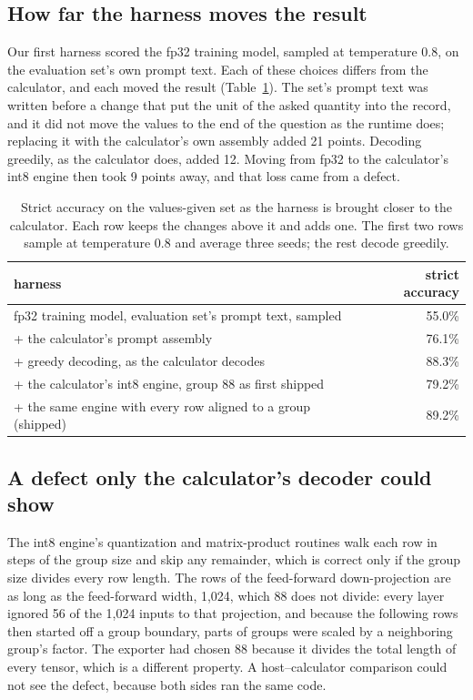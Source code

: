 \documentclass[10pt]{article}
\begin{document}
\subsection{How far the harness moves the result}
\label{sec:harness}

Our first harness scored the fp32 training model, sampled at temperature 0.8, on the evaluation set's own
prompt text. Each of these choices differs from the calculator, and each moved the result
(Table~\ref{tab:harness}). The set's prompt text was written before a change that put the unit of the asked
quantity into the record, and it did not move the values to the end of the question as the runtime does;
replacing it with the calculator's own assembly added 21 points. Decoding greedily, as the calculator does,
added 12. Moving from fp32 to the calculator's int8 engine then took 9 points away, and that loss came from
a defect.

\begin{table}[t]
\caption{Strict accuracy on the values-given set as the harness is brought closer to the calculator.
Each row keeps the changes above it and adds one. The first two rows sample at temperature 0.8 and average
three seeds; the rest decode greedily.}
\label{tab:harness}
\centering\small
\begin{tabular}{@{}lr@{}}
\toprule
harness & strict accuracy \\
\midrule
fp32 training model, evaluation set's prompt text, sampled & 55.0\% \\
\quad + the calculator's prompt assembly & 76.1\% \\
\quad + greedy decoding, as the calculator decodes & 88.3\% \\
\quad + the calculator's int8 engine, group 88 as first shipped & 79.2\% \\
\quad + the same engine with every row aligned to a group (shipped) & 89.2\% \\
\bottomrule
\end{tabular}
\end{table}

\subsection{A defect only the calculator's decoder could show}
\label{sec:defect}

The int8 engine's quantization and matrix-product routines walk each row in steps of the group size
and skip any remainder, which is correct only if the group size divides every row length. The rows
of the feed-forward down-projection are as long as the feed-forward width, 1,024, which 88 does not
divide: every layer ignored 56 of the 1,024 inputs to that projection, and because the following rows then
started off a group boundary, parts of groups were scaled by a neighboring group's factor. The
exporter had chosen 88 because it divides the total length of every tensor, which is a different
property. A host--calculator comparison could not see the defect, because both sides ran the same
code.
\end{document}
